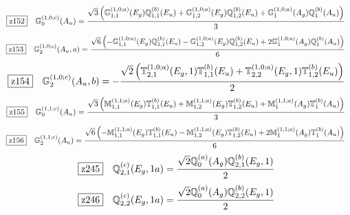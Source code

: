 \documentclass[fleqn,10pt,landscape]{jsarticle}
\begin{document}
\begin{dmath*}
\hspace*{3mm}\fbox{z152}\quad \mathbb{G}_{0}^{(1,0;c)}(A_{u})=\frac{\sqrt{3} \left(\mathbb{G}_{1,1}^{(1,0;a)}(E_{g}) \mathbb{Q}_{1,1}^{(b)}(E_{u}) + \mathbb{G}_{1,2}^{(1,0;a)}(E_{g}) \mathbb{Q}_{1,2}^{(b)}(E_{u}) + \mathbb{G}_{1}^{(1,0;a)}(A_{g}) \mathbb{Q}_{1}^{(b)}(A_{u})\right)}{3}
\end{dmath*}
\begin{dmath*}
\hspace*{3mm}\fbox{z153}\quad \mathbb{G}_{2}^{(1,0;c)}(A_{u},a)=\frac{\sqrt{6} \left(- \mathbb{G}_{1,1}^{(1,0;a)}(E_{g}) \mathbb{Q}_{1,1}^{(b)}(E_{u}) - \mathbb{G}_{1,2}^{(1,0;a)}(E_{g}) \mathbb{Q}_{1,2}^{(b)}(E_{u}) + 2 \mathbb{G}_{1}^{(1,0;a)}(A_{g}) \mathbb{Q}_{1}^{(b)}(A_{u})\right)}{6}
\end{dmath*}
\begin{dmath*}
\hspace*{3mm}\fbox{z154}\quad \mathbb{G}_{2}^{(1,0;c)}(A_{u},b)=- \frac{\sqrt{2} \left(\mathbb{T}_{2,1}^{(1,0;a)}(E_{g},1) \mathbb{T}_{1,1}^{(b)}(E_{u}) + \mathbb{T}_{2,2}^{(1,0;a)}(E_{g},1) \mathbb{T}_{1,2}^{(b)}(E_{u})\right)}{2}
\end{dmath*}
\begin{dmath*}
\hspace*{3mm}\fbox{z155}\quad \mathbb{G}_{0}^{(1,1;c)}(A_{u})=\frac{\sqrt{3} \left(\mathbb{M}_{1,1}^{(1,1;a)}(E_{g}) \mathbb{T}_{1,1}^{(b)}(E_{u}) + \mathbb{M}_{1,2}^{(1,1;a)}(E_{g}) \mathbb{T}_{1,2}^{(b)}(E_{u}) + \mathbb{M}_{1}^{(1,1;a)}(A_{g}) \mathbb{T}_{1}^{(b)}(A_{u})\right)}{3}
\end{dmath*}
\begin{dmath*}
\hspace*{3mm}\fbox{z156}\quad \mathbb{G}_{2}^{(1,1;c)}(A_{u})=\frac{\sqrt{6} \left(- \mathbb{M}_{1,1}^{(1,1;a)}(E_{g}) \mathbb{T}_{1,1}^{(b)}(E_{u}) - \mathbb{M}_{1,2}^{(1,1;a)}(E_{g}) \mathbb{T}_{1,2}^{(b)}(E_{u}) + 2 \mathbb{M}_{1}^{(1,1;a)}(A_{g}) \mathbb{T}_{1}^{(b)}(A_{u})\right)}{6}
\end{dmath*}
\begin{dmath*}
\hspace*{3mm}\fbox{z245}\quad \mathbb{Q}_{2,1}^{(c)}(E_{g},1a)=\frac{\sqrt{2} \mathbb{Q}_{0}^{(a)}(A_{g}) \mathbb{Q}_{2,1}^{(b)}(E_{g},1)}{2}
\end{dmath*}
\begin{dmath*}
\hspace*{3mm}\fbox{z246}\quad \mathbb{Q}_{2,2}^{(c)}(E_{g},1a)=\frac{\sqrt{2} \mathbb{Q}_{0}^{(a)}(A_{g}) \mathbb{Q}_{2,2}^{(b)}(E_{g},1)}{2}
\end{dmath*}
\end{document}
